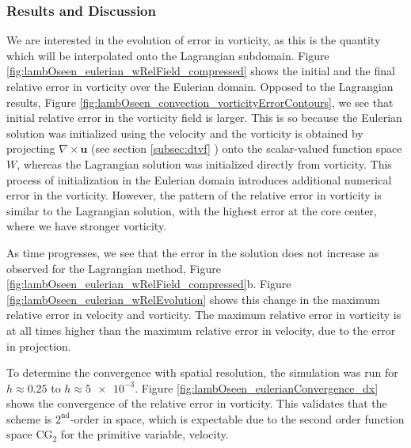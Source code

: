
\subsubsection*{Results and Discussion}

We are interested in the evolution of error in vorticity, as this is the quantity which will be interpolated onto the Lagrangian subdomain. Figure \ref{fig:lambOseen_eulerian_wRelField_compressed} shows the initial and the final relative error in vorticity over the Eulerian domain. Opposed to the Lagrangian results, Figure \ref{fig:lambOseen_convection_vorticityErrorContours}, we see that initial relative error in the vorticity field is larger. This is so because the Eulerian solution was initialized using the velocity and the vorticity is obtained by projecting $\nabla\times\mathbf{u}$ (see section \ref{subsec:dtvf}
) onto the scalar-valued function space $W$, whereas the Lagrangian solution was initialized directly from vorticity. This process of initialization in the Eulerian domain introduces additional numerical error in the vorticity. However, the pattern of the relative error in vorticity is similar to the Lagrangian solution, with the highest error at the core center, where we have stronger vorticity.

As time progresses, we see that the error in the solution does not increase as observed for the Lagrangian method, Figure \ref{fig:lambOseen_eulerian_wRelField_compressed}b. Figure \ref{fig:lambOseen_eulerian_wRelEvolution} shows this change in the maximum relative error in velocity and vorticity. The maximum relative error in vorticity is at all times higher than the maximum relative error in velocity, due to the error in projection.

To determine the convergence with spatial resolution, the simulation was run for $h \approx 0.25$ to $h \approx \num{5e-3}$. Figure \ref{fig:lambOseen_eulerianConvergence_dx} shows the convergence of the relative error in vorticity. This validates that the scheme is $2^{\mathrm{nd}}$-order in space, which is expectable due to the second order function space $\mathrm{CG}_2$ for the primitive variable, velocity.

